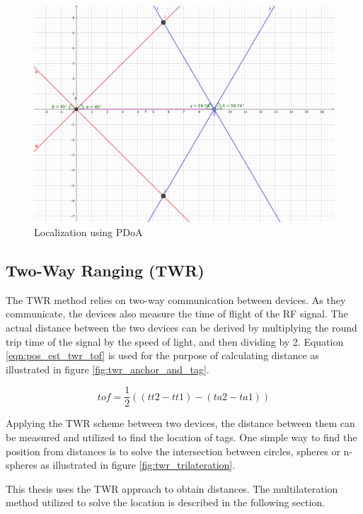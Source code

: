 \documentclass[\main/thesis.tex]{subfiles}
\begin{document}
\begin{figure}[H]
    \centering
    \includegraphics[width=1\textwidth]{pdoa.png}
    \caption{Localization using PDoA}
    \label{fig:pdoa}
\end{figure}

\subsection{Two-Way Ranging (TWR)}
The TWR method relies on two-way communication between devices. As they communicate, the devices also measure the time of flight of the RF signal. The actual distance between the two devices can be derived by multiplying the round trip time of the signal by the speed of light, and then dividing by 2. Equation \ref{eqn:pos_est_twr_tof} is used for the purpose of calculating distance as illustrated in figure \ref{fig:twr_anchor_and_tag}.

\begin{equation}
    tof = \frac{1}{2} ((tt2 - tt1) - (ta2 - ta1))
    \label{eqn:pos_est_twr_tof}
\end{equation}

Applying the TWR scheme between two devices, the distance between them can be measured and utilized to find the location of tags. One simple way to find the position from distances is to solve the intersection between circles, spheres or n-spheres as illustrated in figure \ref{fig:twr_trilateration}.

This thesis uses the TWR approach to obtain distances. The multilateration method utilized to solve the location is described in the following section.
\end{document}
